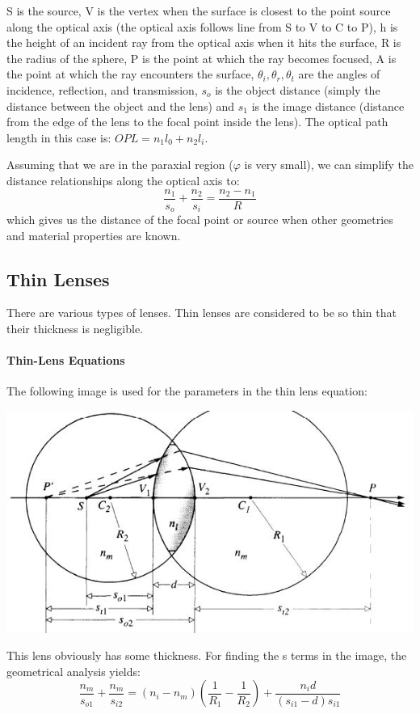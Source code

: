 \documentclass[12pt]{report}
\begin{document}
S is the source, V is the vertex when the surface is closest to the point source along the optical axis (the optical axis follows line from S to V to C to P), h is the height of an incident ray from the optical axis when it hits the surface, R is the radius of the sphere, P is the point at which the ray becomes focused, A is the point at which the ray encounters the surface, $\theta_i, \theta_r, \theta_t$ are the angles of incidence, reflection, and transmission, $s_o$ is the object distance (simply the distance between the object and the lens) and $s_1$ is the image distance (distance from the edge of the lens to the focal point inside the lens). The optical path length in this case is: $OPL = n_1 l_0 + n_2 l_i$. 

Assuming that we are in the paraxial region ($\varphi$ is very small), we can simplify the distance relationships along the optical axis to: \[\frac{n_1}{s_o}+\frac{n_2}{s_i}=\frac{n_2-n_1}{R} \] which gives us the distance of the focal point or source when other geometries and material properties are known. 

\subsection{Thin Lenses}
There are various types of lenses. Thin lenses are considered to be so thin that their thickness is negligible.

\paragraph{Thin-Lens Equations}
The following image is used for the parameters in the thin lens equation: 

\includegraphics[scale=.75]{ThinLens.jpg}

This lens obviously has some thickness. For finding the s terms in the image, the geometrical analysis yields: \[\frac{n_m}{s_{o1}}+\frac{n_m}{s_{i2}} = (n_i-n_m)\left(\frac{1}{R_1}-\frac{1}{R_2}\right)+\frac{n_id}{(s_{i1}-d)s_{i1}} \]
\end{document}
